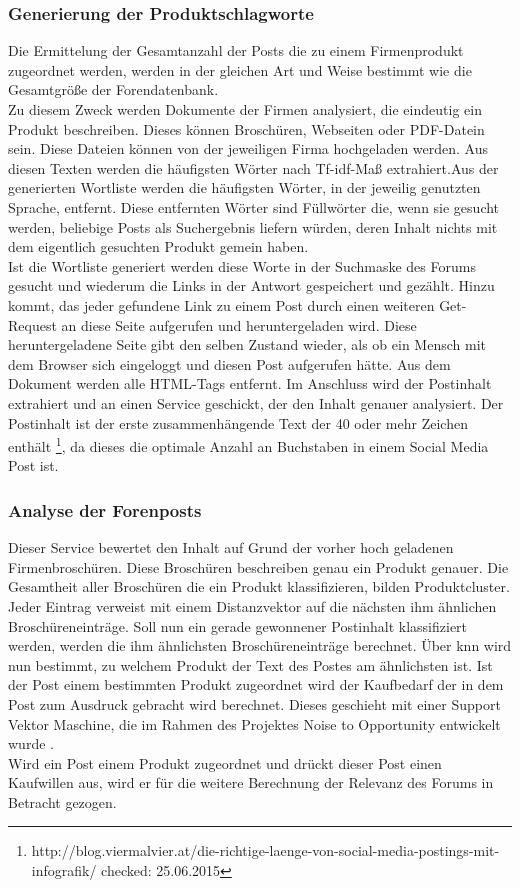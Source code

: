\subsubsection{Generierung der Produktschlagworte}
Die Ermittelung der Gesamtanzahl der Posts die zu einem Firmenprodukt zugeordnet werden, werden in der gleichen Art und Weise bestimmt wie die Gesamtgröße der Forendatenbank.\\
Zu diesem Zweck werden Dokumente der Firmen analysiert, die eindeutig ein Produkt beschreiben. Dieses können Broschüren, Webseiten oder PDF-Datein sein. Diese Dateien können von der jeweiligen Firma hochgeladen werden. Aus diesen Texten werden die häufigsten Wörter nach Tf-idf-Maß extrahiert.Aus der generierten Wortliste werden die häufigsten Wörter, in der jeweilig genutzten Sprache, entfernt. Diese entfernten Wörter sind Füllwörter die, wenn sie gesucht werden, beliebige Posts als Suchergebnis liefern würden, deren Inhalt nichts mit dem eigentlich gesuchten Produkt gemein haben.\\
Ist die Wortliste generiert werden diese Worte in der Suchmaske des Forums gesucht und wiederum die Links in der Antwort gespeichert und gezählt. Hinzu kommt, das jeder gefundene Link zu einem Post durch einen weiteren Get-Request an diese Seite aufgerufen und heruntergeladen wird. Diese heruntergeladene Seite gibt den selben Zustand wieder, als ob ein Mensch mit dem Browser sich eingeloggt und diesen Post aufgerufen hätte. Aus dem Dokument werden alle HTML-Tags entfernt. Im Anschluss wird der Postinhalt extrahiert und an einen Service geschickt, der den Inhalt genauer analysiert. Der Postinhalt ist der erste zusammenhängende Text der 40 oder mehr Zeichen enthält \footnote{http://blog.viermalvier.at/die-richtige-laenge-von-social-media-postings-mit-infografik/ checked: 25.06.2015}, da dieses die optimale Anzahl an Buchstaben in einem Social Media Post ist.
\subsubsection{Analyse der Forenposts}
Dieser Service bewertet den Inhalt auf Grund der vorher hoch geladenen Firmenbroschüren. Diese Broschüren beschreiben genau ein Produkt genauer. Die Gesamtheit aller Broschüren die ein Produkt klassifizieren, bilden Produktcluster. Jeder Eintrag verweist mit einem Distanzvektor auf die nächsten ihm ähnlichen Broschüreneinträge. Soll nun ein gerade gewonnener Postinhalt klassifiziert werden, werden die ihm ähnlichsten Broschüreneinträge berechnet. Über knn wird nun bestimmt, zu welchem Produkt der Text des Postes am ähnlichsten ist. Ist der Post einem bestimmten Produkt zugeordnet wird der Kaufbedarf der in dem Post zum Ausdruck gebracht wird berechnet. Dieses geschieht mit einer Support Vektor Maschine, die im Rahmen des Projektes Noise to Opportunity entwickelt wurde \cite{n2o}.\\
Wird ein Post einem Produkt zugeordnet und drückt dieser Post einen Kaufwillen aus, wird er für die weitere Berechnung der Relevanz des Forums in Betracht gezogen.
